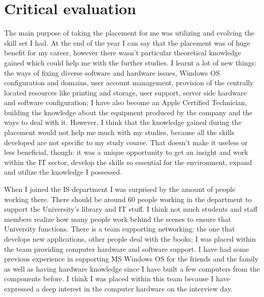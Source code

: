 \documentclass[10pt,a4paper,headinclude=true,twoside]{report}
\begin{document}
\chapter{Critical evaluation}

The main purpose of taking the placement for me was utilizing and evolving the skill set I had. At the end of the year I can say that the placement was of huge benefit for my career, however there wasn't particular theoretical knowledge gained which could help me with the further studies. I learnt a lot of new things: the ways of fixing diverse software and hardware issues, Windows OS configuration and domains, user account management, provision of the centrally located resources like printing and storage, user support, server side hardware and software configuration; I have also become an Apple Certified Technician, building the knowledge about the equipment produced by the company and the ways to deal with it. However, I think that the knowledge gained during the placement would not help me much with my studies, because all the skills developed are not specific to my study course. That doesn't make it useless or less beneficial, though: it was a unique opportunity to get an insight and work within the IT sector, develop the skills so essential for the environment, expand and utilize the knowledge I possessed.

When I joined the IS department I was surprised by the amount of people working there. There should be around 60 people working in the department to support the University's library and IT stuff. I think not much students and staff members realize how many people work behind the scenes to ensure that University functions. There is a team supporting networking; the one that develops new applications, other people deal with the books; I was placed within the team providing computer hardware and software support. I have had some previous experience in supporting MS Windows OS for the friends and the family as well as having hardware knowledge since I have built a few computers from the components before. I think I was placed within this team because I have expressed a deep interest in the computer hardware on the interview day.
\end{document}
